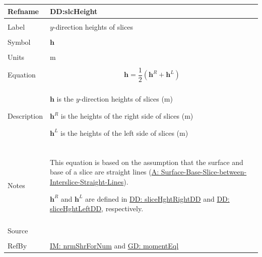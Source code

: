 \documentclass[12pt]{article}
\begin{document}
\vspace{\baselineskip}
\noindent
\begin{minipage}{\textwidth}
\begin{tabular}{>{\raggedright}p{}>{\raggedright\arraybackslash}p{}}
\toprule \textbf{Refname} & \textbf{DD:slcHeight}
\label{DD:slcHeight}
\\ \midrule \\
Label & $y$-direction heights of slices
        
\\ \midrule \\
Symbol & $\mathbf{h}$
         
\\ \midrule \\
Units & m
        
\\ \midrule \\
Equation & \begin{displaymath}
           \mathbf{h}=\frac{1}{2} \left({\mathbf{h}^{R}}+{\mathbf{h}^{L}}\right)
           \end{displaymath}
\\ \midrule \\
Description & \begin{symbDescription}
              \item{$\mathbf{h}$ is the $y$-direction heights of slices (m)}
              \item{${\mathbf{h}^{R}}$ is the heights of the right side of slices (m)}
              \item{${\mathbf{h}^{L}}$ is the heights of the left side of slices (m)}
              \end{symbDescription}
\\ \midrule \\
Notes & This equation is based on the assumption that the surface and base of a slice are straight lines (\hyperref[assumpSBSBISL]{A: Surface-Base-Slice-between-Interslice-Straight-Lines}).
        
        ${\mathbf{h}^{R}}$ and ${\mathbf{h}^{L}}$ are defined in \hyperref[DD:sliceHghtRightDD]{DD: sliceHghtRightDD} and \hyperref[DD:sliceHghtLeftDD]{DD: sliceHghtLeftDD}, respectively.
        
\\ \midrule \\
Source & \cite{fredlund1977}
         
\\ \midrule \\
RefBy & \hyperref[IM:nrmShrForNum]{IM: nrmShrForNum} and \hyperref[GD:momentEql]{GD: momentEql}
        
\\ \bottomrule
\end{tabular}
\end{minipage}
\end{document}

